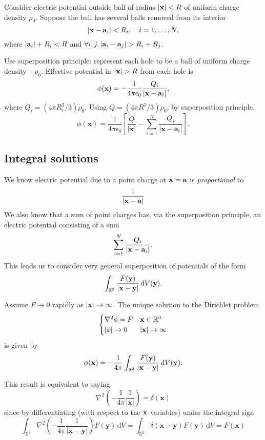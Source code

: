 \begin{example}
    Consider electric potential outside ball of radius $ |{\bf x}|<R $ of uniform charge density $ \rho_0 $. Suppose the ball has several balls removed from its interior
    \[
        |{\bf x}-{\bf a}_i|<R_i,\quad i=1,\dots,N,
    \]
    where $ |{\bf a}_i|+R_i<R $ and $ \forall i,j, |\bfa_i-\bfa_j|>R_i+R_j $.

    Use superposition principle: represent each hole to be a ball of uniform charge density $ -\rho_0 $. Effective potential in $ |\bfx|>R $ from each hole is 
    \[
        \phi({\bf x}) = -\frac{1}{4\pi \epsilon_0}\frac{Q_i}{|{\bf x}-{\bf a}_i|},
    \]
    where $Q_{i}=\left(4 \pi R_{i}^{3} / 3\right) \rho_{0}$. Using $ Q=\left(4 \pi R^{3} / 3\right) \rho_{0} $, by superposition principle, 
    \[
        \phi(\mathbf{x})=\frac{1}{4 \pi \epsilon_{0}}\left[\frac{Q}{|\mathbf{x}|}-\sum_{i=1}^{N} \frac{Q_{i}}{\left|\mathbf{x}-\mathbf{a}_{i}\right|}\right].
    \]
\end{example}

\subsection{Integral solutions}
We know electric potential due to a point charge at $ {\bf x}={\bf a} $ is \textit{proportional} to 
\[
    \frac{1}{|{\bf x}-{\bf a}|}
\]
We also know that a sum of point charges has, via the superposition principle, an electric potential consisting of a sum
\[
    \sum_{i=1}^{N}\frac{Q_i}{|{\bf x}-{\bf a}_i|}.
\]
This leads us to consider very general superposition of potentials of the form
\[
    \int_{{\mathbb{R}}^3} \frac{F({\bf y})}{|{\bf x}-{\bf y}|} \,\mathrm{d}V({\bf y}).
\]
\begin{proposition}
    Assume $F\to 0$ rapidly as $ |{\bf x}|\to \infty $. The unique solution to the Dirichlet problem
    \[
        \begin{cases}
        \laplacian\phi=F &\bfx\in\bbR^3\\
        |\phi|\to 0 &|\bfx|\to \infty\\
        \end{cases} 
    \]
    is given by 
    \[
        \phi({\bf x}) = -\frac{1}{4\pi}\int_{{\mathbb{R}}^3} \frac{F({\bf y})}{|{\bf x}-{\bf y}|} \,\mathrm{d}V({\bf y}).
    \]
\end{proposition}

This result is equivalent to saying
\[
    \nabla^{2}\left(-\frac{1}{4 \pi} \frac{1}{|\mathbf{x}|}\right)=\delta(\mathbf{x})
\]
since by differentiating (with respect to the ${\bf x}$-variables) under the integral sign
\[
    \int_{\mathbb{R}^{3}} \nabla^{2}\left(-\frac{1}{4 \pi} \frac{1}{|\mathbf{x}-\mathbf{y}|}\right) F(\mathbf{y}) \,\mathrm{d} V=\int_{\mathbb{R}^{3}} \delta(\mathbf{x}-\mathbf{y}) F(\mathbf{y}) \,\mathrm{d} V=F(\mathbf{x})
\]

